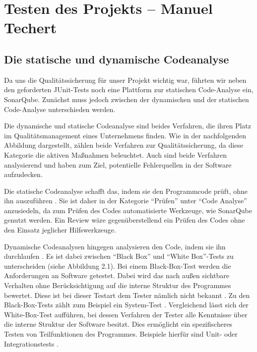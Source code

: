 \chapter{Testen des Projekts -- Manuel Techert}

\section{Die statische und dynamische Codeanalyse}

Da uns die Qualitätssicherung für unser Projekt wichtig war, führten wir neben den geforderten JUnit-Tests noch eine Plattform zur statischen Code-Analyse ein, SonarQube. Zunächst muss jedoch zwischen der dynamischen und der statischen Code-Analyse unterschieden werden.

Die dynamische und statische Codeanalyse sind beides Verfahren, die ihren Platz im Qualitätsmanagement eines Unternehmens finden. Wie in der nachfolgenden Abbildung dargestellt, zählen beide Verfahren zur Qualitätssicherung, da diese Kategorie die aktiven Maßnahmen beleuchtet. Auch sind beide Verfahren analysierend und haben zum Ziel, potentielle Fehlerquellen in der Software aufzudecken.

Die statische Codeanalyse schafft das, indem sie den Programmcode prüft, ohne ihn auszuführen \autocite[Vgl.][S.115]{PraxiswissenSoftwaretest}. Sie ist daher in der Kategorie \enquote{Prüfen} unter \enquote{Code Analyse} anzusiedeln, da zum Prüfen des Codes automatisierte Werkzeuge, wie SonarQube genutzt werden. Ein Review wäre gegenüberstellend ein Prüfen des Codes ohne den Einsatz jeglicher Hilfswerkzeuge\autocite[Vgl.][]{StatischeCodeanalyse}.

Dynamische Codeanalysen hingegen analysieren den Code, indem sie ihn durchlaufen \autocite[Vgl.][S.128]{PraxiswissenSoftwaretest}. Es ist dabei zwischen \enquote{Black Box} und \enquote{White Box}-Tests zu unterscheiden  (siehe Abbildung 2.1).
Bei einem Black-Box-Test werden die Anforderungen an Software getestet. Dabei wird das nach außen sichtbare Verhalten ohne Berücksichtigung auf die interne Struktur des Programmes bewertet. Diese ist bei dieser Testart dem Tester nämlich nicht bekannt \autocite[Vgl.][]{BlackWhiteTests}. Zu den Black-Box-Tests zählt zum Beispiel ein System-Test \autocite[Vgl.][]{BlackWhiteTests}.
Vergleichend lässt sich der White-Box-Test aufführen, bei dessen Verfahren der Tester alle Kenntnisse über die interne Struktur der Software besitzt. Dies ermöglicht ein spezifischeres Testen von Teilfunktionen des Programmes. Beispiele hierfür sind Unit- oder Integrationstests \autocite[Vgl.][]{BlackWhiteTests}.

